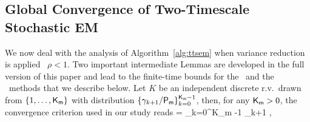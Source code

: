 \documentclass[conference,letterpaper]{IEEEtran}
\newtheorem{Lemma}{Lemma}
\begin{document}
\subsection{Global Convergence of Two-Timescale Stochastic EM}


We now deal with the analysis of Algorithm~\ref{alg:ttsem} when variance reduction is applied \ie\ $\rho <1$.
Two important intermediate Lemmas are developed in the full version of this paper and lead to the finite-time bounds for the \SAEMVR\ and the \FISAEM\ methods that we describe below.
Let $K$ be an independent discrete r.v.~drawn from $\{1,\dots,{\sf K}_{\sf m }\}$ with distribution  $\{ \gamma_{k+1}/ {\sf P}_{\sf m}\}_{k=0}^{{\sf K}_{\sf m } - 1 }$, then, for any ${\sf K}_{\sf m } >0 $, the convergence criterion used in our study reads
\beq\notag
\EE[ \| \grd V( \hs{K} ) \|^2 ]  =  \sum_{k=0}^{{\sf K}_{\sf m }-1} \gamma_{k+1} \EE[ \| \grd V( \hs{k} ) \|^2 ] \eqs,
\end{document}
